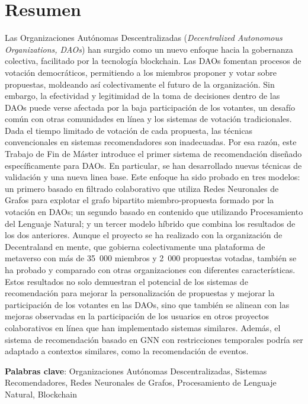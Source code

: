\chapter*{Resumen}

Las Organizaciones Autónomas Descentralizadas (\textit{Decentralized Autonomous Organizations, DAOs}) han surgido como un nuevo enfoque hacia la gobernanza colectiva, facilitado por la tecnología blockchain. Las DAOs fomentan procesos de votación democráticos, permitiendo a los miembros proponer y votar sobre propuestas, moldeando así colectivamente el futuro de la organización. Sin embargo, la efectividad y legitimidad de la toma de decisiones dentro de las DAOs puede verse afectada por la baja participación de los votantes, un desafío común con otras comunidades en línea y los sistemas de votación tradicionales. Dada el tiempo limitado de votación de cada propuesta, las técnicas convencionales en sistemas recomendadores son inadecuadas. Por esa razón, este Trabajo de Fin de Máster introduce el primer sistema de recomendación diseñado específicamente para DAOs. En particular, se han desarrollado nuevas técnicas de validación y una nueva linea base. Este enfoque ha sido probado en tres modelos: un primero basado en filtrado colaborativo que utiliza Redes Neuronales de Grafos para explotar el grafo bipartito miembro-propuesta formado por la votación en DAOs; un segundo basado en contenido que utilizando Procesamiento del Lenguaje Natural; y un tercer modelo híbrido que combina los resultados de los dos anteriores. Aunque el proyecto se ha realizado con la organización de Decentraland en mente, que gobierna colectivamente una plataforma de metaverso con más de 35~000 miembros y 2~000 propuestas votadas, también se ha probado y comparado con otras organizaciones con diferentes características. Estos resultados no solo demuestran el potencial de los sistemas de recomendación para mejorar la personalización de propuestas y mejorar la participación de los votantes en las DAOs, sino que también se alinean con las mejoras observadas en la participación de los usuarios en otros proyectos colaborativos en línea que han implementado sistemas similares. Además, el sistema de recomendación basado en GNN con restricciones temporales podría ser adaptado a contextos similares, como la recomendación de eventos.

\textbf{Palabras clave}: Organizaciones Autónomas Descentralizadas, Sistemas Recomendadores, Redes Neuronales de Grafos, Procesamiento de Lenguaje Natural, Blockchain

